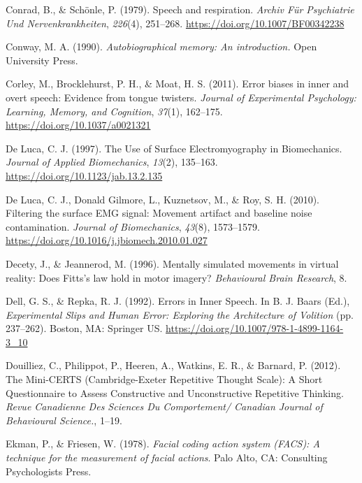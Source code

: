 \documentclass[a4paper,12pt,twoside,openright,oldfontcommands]{memoir}
\begin{document}
\hypertarget{ref-conrad_speech_1979}{}
Conrad, B., \& Schönle, P. (1979). Speech and respiration. \emph{Archiv
Für Psychiatrie Und Nervenkrankheiten}, \emph{226}(4), 251--268.
\url{https://doi.org/10.1007/BF00342238}

\hypertarget{ref-conway_autobiographical_1990}{}
Conway, M. A. (1990). \emph{Autobiographical memory: An introduction.}
Open University Press.

\hypertarget{ref-corley_error_2011}{}
Corley, M., Brocklehurst, P. H., \& Moat, H. S. (2011). Error biases in
inner and overt speech: Evidence from tongue twisters. \emph{Journal of
Experimental Psychology: Learning, Memory, and Cognition}, \emph{37}(1),
162--175. \url{https://doi.org/10.1037/a0021321}

\hypertarget{ref-de_luca_use_1997}{}
De Luca, C. J. (1997). The Use of Surface Electromyography in
Biomechanics. \emph{Journal of Applied Biomechanics}, \emph{13}(2),
135--163. \url{https://doi.org/10.1123/jab.13.2.135}

\hypertarget{ref-de_luca_filtering_2010}{}
De Luca, C. J., Donald Gilmore, L., Kuznetsov, M., \& Roy, S. H. (2010).
Filtering the surface EMG signal: Movement artifact and baseline noise
contamination. \emph{Journal of Biomechanics}, \emph{43}(8), 1573--1579.
\url{https://doi.org/10.1016/j.jbiomech.2010.01.027}

\hypertarget{ref-decety_mentally_1996}{}
Decety, J., \& Jeannerod, M. (1996). Mentally simulated movements in
virtual reality: Does Fitts's law hold in motor imagery?
\emph{Behavioural Brain Research}, 8.

\hypertarget{ref-dell_errors_1992}{}
Dell, G. S., \& Repka, R. J. (1992). Errors in Inner Speech. In B. J.
Baars (Ed.), \emph{Experimental Slips and Human Error: Exploring the
Architecture of Volition} (pp. 237--262). Boston, MA: Springer US.
\url{https://doi.org/10.1007/978-1-4899-1164-3_10}

\hypertarget{ref-Douilliez2012}{}
Douilliez, C., Philippot, P., Heeren, A., Watkins, E. R., \& Barnard, P.
(2012). The Mini-CERTS (Cambridge-Exeter Repetitive Thought Scale): A
Short Questionnaire to Assess Constructive and Unconstructive Repetitive
Thinking. \emph{Revue Canadienne Des Sciences Du Comportement/ Canadian
Journal of Behavioural Science.}, 1--19.

\hypertarget{ref-ekman_facial_1978}{}
Ekman, P., \& Friesen, W. (1978). \emph{Facial coding action system
(FACS): A technique for the measurement of facial actions}. Palo Alto,
CA: Consulting Psychologists Press.
\end{document}
